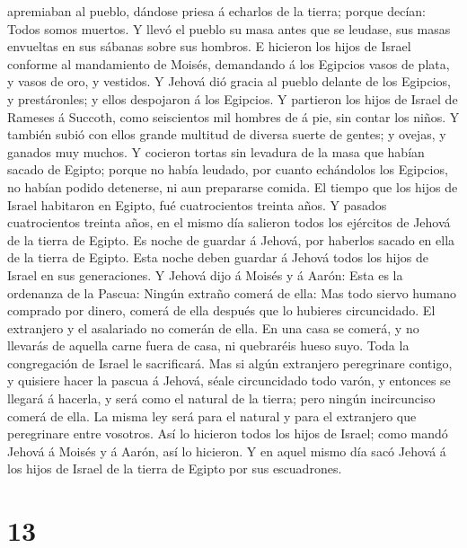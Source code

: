 apremiaban al pueblo, dándose priesa á echarlos de la tierra; porque
decían: Todos somos muertos.  Y llevó el pueblo su masa
antes que se leudase, sus masas envueltas en sus sábanas sobre sus
hombros.  E hicieron los hijos de Israel conforme al
mandamiento de Moisés, demandando á los Egipcios vasos de plata, y vasos
de oro, y vestidos.  Y Jehová dió gracia al pueblo
delante de los Egipcios, y prestáronles; y ellos despojaron á los
Egipcios.  Y partieron los hijos de Israel de Rameses á
Succoth, como seiscientos mil hombres de á pie, sin contar los niños.
 Y también subió con ellos grande multitud de diversa
suerte de gentes; y ovejas, y ganados muy muchos.  Y
cocieron tortas sin levadura de la masa que habían sacado de Egipto;
porque no había leudado, por cuanto echándolos los Egipcios, no habían
podido detenerse, ni aun prepararse comida.  El tiempo
que los hijos de Israel habitaron en Egipto, fué cuatrocientos treinta
años.  Y pasados cuatrocientos treinta años, en el mismo
día salieron todos los ejércitos de Jehová de la tierra de Egipto.
 Es noche de guardar á Jehová, por haberlos sacado en
ella de la tierra de Egipto. Esta noche deben guardar á Jehová todos los
hijos de Israel en sus generaciones.  Y Jehová dijo á
Moisés y á Aarón: Esta es la ordenanza de la Pascua: Ningún extraño
comerá de ella:  Mas todo siervo humano comprado por
dinero, comerá de ella después que lo hubieres circuncidado.
 El extranjero y el asalariado no comerán de ella.
 En una casa se comerá, y no llevarás de aquella carne
fuera de casa, ni quebraréis hueso suyo.  Toda la
congregación de Israel le sacrificará.  Mas si algún
extranjero peregrinare contigo, y quisiere hacer la pascua á Jehová,
séale circuncidado todo varón, y entonces se llegará á hacerla, y será
como el natural de la tierra; pero ningún incircunciso comerá de ella.
 La misma ley será para el natural y para el extranjero
que peregrinare entre vosotros.  Así lo hicieron todos
los hijos de Israel; como mandó Jehová á Moisés y á Aarón, así lo
hicieron.  Y en aquel mismo día sacó Jehová á los hijos
de Israel de la tierra de Egipto por sus escuadrones.

\hypertarget{section-12}{%
\section{13}\label{section-12}}

